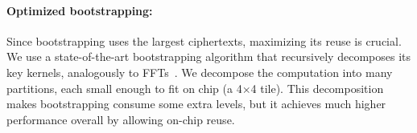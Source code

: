 \paragraph{Optimized bootstrapping:}
Since bootstrapping uses the largest ciphertexts, maximizing its reuse is
crucial. We use a state-of-the-art bootstrapping algorithm that recursively
decomposes its key kernels, analogously to FFTs~\cite{chen:2019:improved}. We
decompose the computation into many partitions, each small enough to fit on
chip (a 4$\times$4 tile). This decomposition makes bootstrapping consume some
extra levels, but it achieves much higher performance overall by allowing
on-chip reuse.
